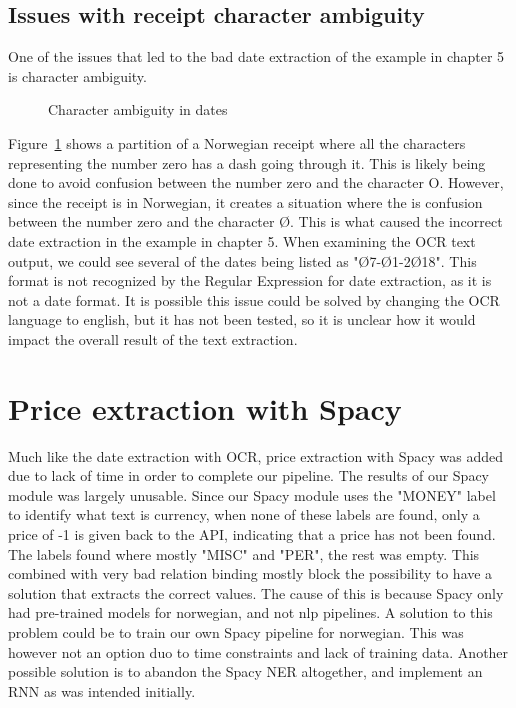 \subsection{Issues with receipt character ambiguity}\label{subsec:issues-with-receipt-character-ambiguity}
One of the issues that led to the bad date extraction of the example in chapter 5 is character ambiguity.

\begin{figure}[h]
    \caption{Character ambiguity in dates}
    \label{fig:zeroletter}
\end{figure}

Figure~\ref{fig:zeroletter} shows a partition of a Norwegian receipt where all the characters representing the number
zero has a dash going through it.
This is likely being done to avoid confusion between the number zero and the character O\@.
However, since the receipt is in Norwegian, it creates a situation where the is confusion between the number zero and the character Ø\@.
This is what caused the incorrect date extraction in the example in chapter 5.
When examining the OCR text output, we could see several of the dates being listed as "Ø7-Ø1-2Ø18".
This format is not recognized by the Regular Expression for date extraction, as it is not a date format.
It is possible this issue could be solved by changing the OCR language to english, but it has not been tested, so it is unclear how it would impact the overall result of the text extraction.

\section{Price extraction with Spacy}\label{sec:price-extraction-with-spacy}
Much like the date extraction with OCR, price extraction with Spacy was added due to lack of time in order to complete our pipeline.
The results of our Spacy module was largely unusable.
Since our Spacy module uses the "MONEY" label to identify what text is currency, when none of these labels are found, only a price of -1 is given back to the API, indicating that a price has not been found.
The labels found where mostly "MISC" and "PER", the rest was empty.
This combined with very bad relation binding mostly block the possibility to have a solution that extracts the correct values.
The cause of this is because Spacy only had pre-trained models for norwegian, and not nlp pipelines.
A solution to this problem could be to train our own Spacy pipeline for norwegian.
This was however not an option duo to time constraints and lack of training data.
Another possible solution is to abandon the Spacy NER altogether, and implement an RNN as was intended initially.


